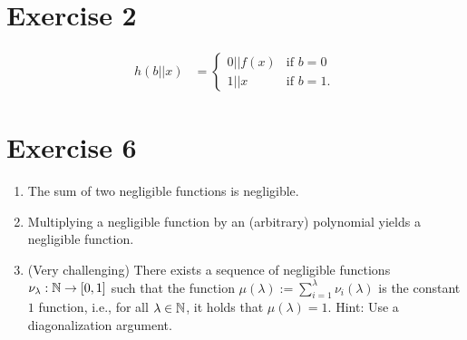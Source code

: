 \documentclass{article}      	%
\begin{document}
\section*{Exercise 2}

\begin{align*}
    h(b||x) &=
        \begin{cases}
            0 || f(x)  & \text{if } b = 0\\
            1 || x     & \text{if } b = 1.
        \end{cases}
\end{align*}

\section*{Exercise 6}

\begin{enumerate}[label = (\alph*)] %
    \item The sum of two negligible functions is negligible.
    \item Multiplying a negligible function by an (arbitrary) polynomial yields a negligible function.
    \item (Very challenging) There exists a sequence of negligible functions 
    $\nu_\lambda: \mathbb{N} \rightarrow[0,1]$ 
    such that the function
    $\mu(\lambda) := \sum_{i = 1}^\lambda \nu_i(\lambda)$
    is the constant $1$ function, i.e., for all $\lambda \in \mathbb{N}$, it holds that $\mu(\lambda) = 1$. Hint: Use a diagonalization argument.
\end{enumerate}
\end{document}
